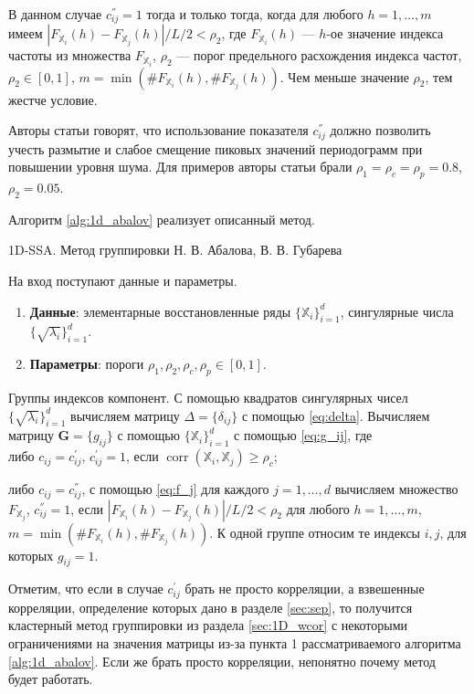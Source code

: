 \documentclass[specialist,
               substylefile = spbu.rtx,
               subf,href,colorlinks=true, 12pt]{disser}
\def\corr{\mathop{\mathrm{corr}}}
\begin{document}
В данном случае $c^{''}_{ij}=1$ тогда и только тогда, когда для любого $h=1,\ldots,m$ имеем $|F_{\mathbb{X}_i}(h) - F_{\mathbb{X}_j}(h)|/ L/2 < \rho_2$, где $F_{\mathbb{X}_i}(h)$ --- $h$-ое значение индекса частоты из множества $F_{\mathbb{X}_i}$, $\rho_2$ --- порог предельного расхождения индекса частот,  $\rho_2 \in [0,1]$, $m = \min\left(\#F_{\mathbb{X}_i}(h), \#F_{\mathbb{X}_j}(h) \right)$. Чем меньше значение $\rho_2$, тем жестче условие.

Авторы статьи говорят, что использование показателя $c^{''}_{ij}$ должно позволить
учесть размытие и слабое смещение пиковых значений периодограмм при повышении уровня шума.
Для примеров авторы статьи брали $\rho_1 =\rho_c =\rho_p = 0.8$, $\rho_2 = 0.05$.

Алгоритм \ref{alg:1d_abalov} реализует описанный метод.

\begin{algorithm}[!hhh]
\caption{1D-SSA. Метод группировки Н. В. Абалова, В. В. Губарева}
\label{alg:1d_abalov}
\begin{algorithmic}[1]
\REQUIRE На вход поступают данные и параметры.
\begin{enumerate}
\item \textbf{Данные}: элементарные восстановленные ряды $\{\mathbb{X}_i\}_{i=1}^{d}$, сингулярные числа $\{\sqrt{\lambda_i}\}_{i=1}^{d}$.
\item \textbf{Параметры}: пороги $\rho_1, \rho_2, \rho_c, \rho_p  \in [0,1]$.
\end{enumerate}
\ENSURE Группы индексов компонент.
\STATE  С помощью квадратов сингулярных чисел $\{\sqrt{\lambda_i}\}_{i=1}^{d}$ вычисляем матрицу $\Delta = \{\delta_{ij}\}$ с помощью \eqref{eq:delta}.
\STATE Вычисляем матрицу $\mathbf{G}=\{g_{ij}\}$ с помощью $\{\mathbb{X}_i\}_{i=1}^{d}$ с помощью \eqref{eq:g_ij}, где\\
либо $c_{ij} = c_{ij}^{'}$, $c_{ij}^{'} = 1$, если  $\corr(\mathbb{X}_i, \mathbb{X}_j) \geqslant \rho_c$;

либо $c_{ij} = c_{ij}^{''}$, с помощью \eqref{eq:f_j} для каждого $j = 1,\ldots, d$ вычисляем множество $F_{\mathbb{X}_j}$, $c_{ij}^{''} = 1$, если $|F_{\mathbb{X}_i}(h) - F_{\mathbb{X}_j}(h)|/ L/2 < \rho_2$ для любого $h=1,\ldots,m$, $m = \min\left(\#F_{\mathbb{X}_i}(h), \#F_{\mathbb{X}_j}(h) \right)$.
\STATE К одной группе относим те индексы $i,j$, для которых $g_{ij} = 1$.
\end{algorithmic}
\end{algorithm}


Отметим, что если в случае $c_{ij}^{'}$ брать не просто корреляции, а взвешенные корреляции, определение которых дано в разделе \ref{sec:sep}, то получится кластерный метод группировки из раздела \ref{sec:1D_wcor} с некоторыми ограничениями на значения матрицы из-за пункта 1 рассматриваемого алгоритма \ref{alg:1d_abalov}. Если же брать просто корреляции, непонятно почему метод будет работать.
\end{document}
